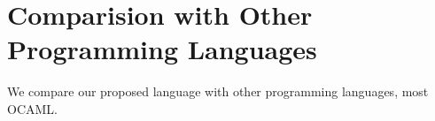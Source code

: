 
\section{Comparision with Other Programming Languages}

We compare our proposed language with other programming languages,
most OCAML.

